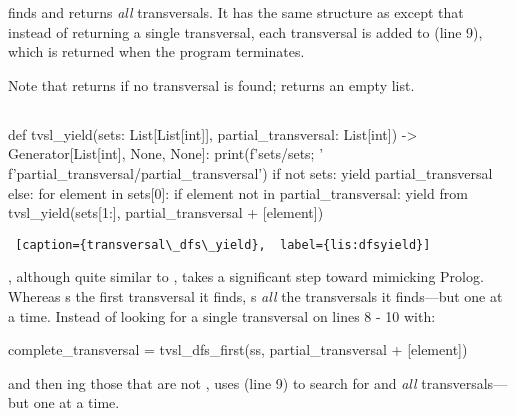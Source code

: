\smallv

 finds and returns \textit{all} transversals. It has the same structure as  except that instead of returning a single transversal, each transversal is added to  (line 9), which is returned when the program terminates. 

Note that  returns  if no transversal is found;  returns an empty list. 


\subsection{}

\begin{minipage}{\linewidth} \largev   \hrulefill
\begin{python}[numbers=left]
def tvsl_yield(sets: List[List[int]], partial_transversal: List[int]) -> Generator[List[int], None, None]:
  print(f'sets/{sets}; '
        f'partial_transversal/{partial_transversal}')
  if not sets:
    yield partial_transversal
  else:
    for element in sets[0]:
      if element not in partial_transversal:
        yield from tvsl_yield(sets[1:], partial_transversal + [element])
            
\end{python}
\begin{lstlisting} [caption={transversal\_dfs\_yield},  label={lis:dfsyield}]
\end{lstlisting}
\end{minipage}

\smallv

, although quite similar to , takes a significant step toward mimicking Prolog. Whereas  s the first transversal it finds,  s \textit{all} the transversals it finds---but one at a time.  Instead of looking for a single transversal on lines 8 - 10 with:
\begin{python}
complete_transversal = tvsl_dfs_first(ss, partial_transversal + [element])
\end{python}
and then ing those that are not ,  uses  (line 9) to search for and  \textit{all} transversals---but one at a time.

